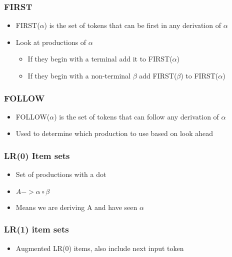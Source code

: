 \documentclass[usepdftitle=false,professionalfonts,compress ]{beamer}
\begin{document}
{
\begin{frame}\frametitle{FIRST}

	\begin{itemize}
	\item FIRST($\alpha$) is the set of tokens that can be first in any derivation of $\alpha$
			\item Look at productions of $\alpha$

	\begin{itemize}
	\item If they begin with a terminal add it to FIRST($\alpha$)
			\item If they begin with a non-terminal $\beta$ add FIRST($\beta$) to FIRST($\alpha$)
				\end{itemize}

				\end{itemize}

\end{frame}}




{
\begin{frame}\frametitle{FOLLOW}

	\begin{itemize}
	\item FOLLOW($\alpha$) is the set of tokens that can follow any derivation of $\alpha$
			\item Used to determine which production to use based on look ahead
				\end{itemize}

\end{frame}}




{
\begin{frame}\frametitle{LR(0) Item sets}

	\begin{itemize}
	\item Set of productions with a dot
			\item $A -> \alpha \circ \beta$
			\item Means we are deriving A and have seen $\alpha$
				\end{itemize}

\end{frame}}





{
\begin{frame}\frametitle{LR(1) item sets}

	\begin{itemize}
	\item Augmented LR(0) items, also include next input token
				\end{itemize}

\end{frame}}
\end{document}
